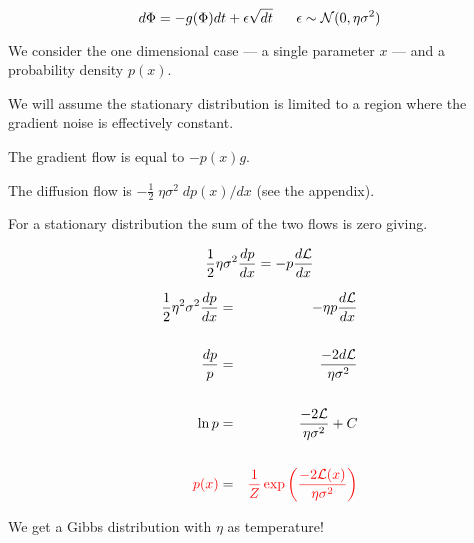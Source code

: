 {{\color{red} $$d\Phi =  -g(\Phi)dt + \epsilon \sqrt{dt}\;\;\;\;\;\; \epsilon \sim {\cal N}(0,\eta\sigma^2)$$}


We consider the one dimensional case --- a single parameter $x$ --- and a probability density $p(x)$.

\vfill
We will assume the stationary distribution is limited to a region where the gradient noise is effectively constant.

\vfill
The gradient flow is equal to $- p(x)g$.

\vfill
The diffusion flow is  $- \frac{1}{2} \;\eta\sigma^2\;dp(x)/dx$ (see the appendix).


\vfill
For a stationary distribution the sum of the two flows is zero giving.

\vfill
{\color{red} $$\frac{1}{2} \eta \sigma^2 \frac{dp}{dx} = - p\frac{d{\cal L}}{dx}$$}



\vspace{-2ex}
\begin{eqnarray*}
\frac{1}{2} \eta^2 \sigma^2 \frac{dp}{dx} & = & - \eta p\frac{d{\cal L}}{dx} \\
\\
\frac{dp}{p} & = & \frac{-2d{\cal L}}{\eta\sigma^2} \\
\\
\ln p & = & \frac{-2{\cal L}}{\eta \sigma^2} + C \\
\\
{\color{red} p(x)} & = & {\color{red} \frac{1}{Z}\exp\left(\frac{-2{\cal L}(x)}{\eta \sigma^2}\right)}
\end{eqnarray*}

\vfill
We get a Gibbs distribution with $\eta$ as temperature!

}

